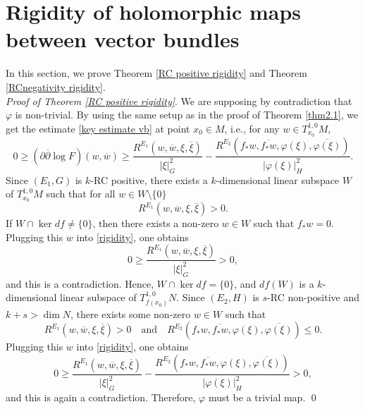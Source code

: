 \documentclass[12pt]{amsart}
\newcommand\bp{{\bar\partial}}
\theoremstyle{plain}
\theoremstyle{definition}
\newcommand{\p}{\partial}
\renewcommand{\bar}{\overline}
\renewcommand{\phi}{\varphi}
\newcommand{\beq}{\begin{equation}}
\newcommand{\eeq}{\end{equation}}
\newcommand{\qtq}[1]{\quad\mbox{#1}\quad}
\renewcommand{\bp}{\bar{\partial}}
\renewcommand{\>}{\rightarrow}
\numberwithin{equation}{section} %
\begin{document}
\baselineskip

\section{Rigidity of holomorphic maps between vector bundles}

In this section, we prove Theorem \ref{RC positive rigidity} and Theorem \ref{RCnegativity rigidity}.\\

\noindent \emph{Proof of Theorem \ref{RC positive rigidity}}.
We are supposing by contradiction that $\phi$ is non-trivial.
By  using the same setup as in the proof of Theorem \ref{thm2.1}, we get the estimate \eqref{key estimate vb} at point $x_0\in M$, i.e., for any $w\in T^{1,0}_{x_0}M$,
\beq
0 \ge \left(\p\bp\log F\right)(w,\bar w)
\ge \frac{R^{E_1}\left(w,\bar w,\xi,\bar \xi\right)}{|\xi|_G^2} -\frac{ R^{E_2}\left(f_*w,\bar{f_*w},\phi(\xi),\bar{\phi(\xi)}\right) }{|\phi(\xi)|^2_H} .
\label{rigidity}
\eeq
Since $(E_1,G)$ is $k$-RC positive,
there exists a $k$-dimensional linear subspace $W$ of $T_{x_0}^{1,0}M$ such that for all $w\in W\setminus\{0\}$
\[
R^{E_1}\left(w,\bar w,\xi,\bar \xi\right)>0.
\]
If $W\cap \ker df\ne \{0\}$, then there exists a non-zero $w\in W$ such that $f_*w=0$.
Plugging this $w$ into \eqref{rigidity}, one obtains
\beq
0\ge  \frac{R^{E_1}\left(w,\bar w,\xi,\bar \xi\right)}{|\xi|_G^2} >0,
\eeq  and this is
a contradiction. Hence,  $W\cap \ker df= \{0\}$, and  $df(W)$ is a $k$-dimensional linear subspace of $T_{f(x_0)}^{1,0}N$.
Since  $(E_2, H)$ is $s$-RC non-positive and $k+s>\dim N$, there exists some non-zero  $w\in W$ such that
\[
R^{E_1}\left(w,\bar w,\xi,\bar \xi\right)>0\qtq{and} R^{E_2}\left(f_*w,\bar{f_*w},\phi(\xi),\bar{\phi(\xi)}\right)\le 0.
\]
Plugging this $w$ into \eqref{rigidity}, one obtains
\beq
0
\ge \frac{R^{E_1}\left(w,\bar w,\xi,\bar \xi\right)}{|\xi|_G^2} -\frac{ R^{E_2}\left(f_*w,\bar{f_*w},\phi(\xi),\bar{\phi(\xi)}\right) }{|\phi(\xi)|^2_H}
>0,
\eeq and this is again
a contradiction. Therefore,  $\phi$ must be a trivial map. \qed

\baselineskip\noindent
\end{document}
